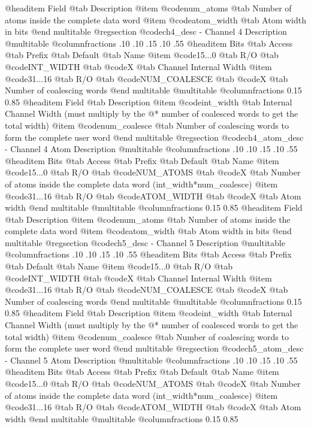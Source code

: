 @headitem Field @tab Description
@item @code{num_atoms} @tab Number of atoms inside the complete data word
@item @code{atom_width} @tab Atom width in bits
@end multitable
@regsection @code{ch4_desc} - Channel 4 Description
@multitable @columnfractions .10 .10 .15 .10 .55
@headitem Bits @tab Access @tab Prefix @tab Default @tab Name
@item @code{15...0}
@tab R/O @tab
@code{INT_WIDTH}
@tab @code{X} @tab 
Channel Internal Width
@item @code{31...16}
@tab R/O @tab
@code{NUM_COALESCE}
@tab @code{X} @tab 
Number of coalescing words
@end multitable
@multitable @columnfractions 0.15 0.85
@headitem Field @tab Description
@item @code{int_width} @tab Internal Channel Width (must multiply by the @* number of coalesced words to get the total width)
@item @code{num_coalesce} @tab Number of coalescing words to form the complete user word
@end multitable
@regsection @code{ch4_atom_desc} - Channel 4 Atom Description
@multitable @columnfractions .10 .10 .15 .10 .55
@headitem Bits @tab Access @tab Prefix @tab Default @tab Name
@item @code{15...0}
@tab R/O @tab
@code{NUM_ATOMS}
@tab @code{X} @tab 
Number of atoms inside the complete data word (int_width*num_coalesce)
@item @code{31...16}
@tab R/O @tab
@code{ATOM_WIDTH}
@tab @code{X} @tab 
Atom width
@end multitable
@multitable @columnfractions 0.15 0.85
@headitem Field @tab Description
@item @code{num_atoms} @tab Number of atoms inside the complete data word
@item @code{atom_width} @tab Atom width in bits
@end multitable
@regsection @code{ch5_desc} - Channel 5 Description
@multitable @columnfractions .10 .10 .15 .10 .55
@headitem Bits @tab Access @tab Prefix @tab Default @tab Name
@item @code{15...0}
@tab R/O @tab
@code{INT_WIDTH}
@tab @code{X} @tab 
Channel Internal Width
@item @code{31...16}
@tab R/O @tab
@code{NUM_COALESCE}
@tab @code{X} @tab 
Number of coalescing words
@end multitable
@multitable @columnfractions 0.15 0.85
@headitem Field @tab Description
@item @code{int_width} @tab Internal Channel Width (must multiply by the @* number of coalesced words to get the total width)
@item @code{num_coalesce} @tab Number of coalescing words to form the complete user word
@end multitable
@regsection @code{ch5_atom_desc} - Channel 5 Atom Description
@multitable @columnfractions .10 .10 .15 .10 .55
@headitem Bits @tab Access @tab Prefix @tab Default @tab Name
@item @code{15...0}
@tab R/O @tab
@code{NUM_ATOMS}
@tab @code{X} @tab 
Number of atoms inside the complete data word (int_width*num_coalesce)
@item @code{31...16}
@tab R/O @tab
@code{ATOM_WIDTH}
@tab @code{X} @tab 
Atom width
@end multitable
@multitable @columnfractions 0.15 0.85
